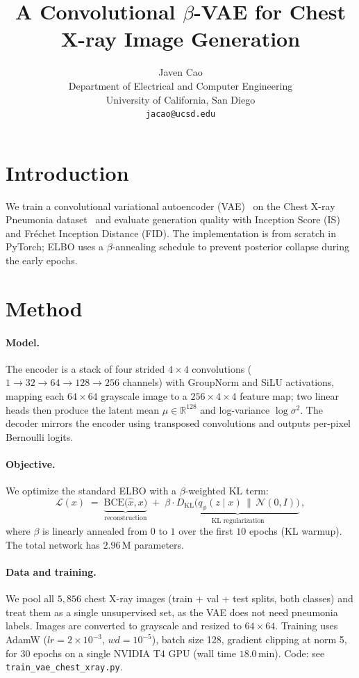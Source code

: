 \documentclass{article}
\title{A Convolutional $\beta$-VAE for Chest X-ray Image Generation}
\author{%
  Javen Cao \\
  Department of Electrical and Computer Engineering \\
  University of California, San Diego \\
  \texttt{jacao@ucsd.edu}
}
\begin{document}
\maketitle

\vspace{-1.0em}

\section{Introduction}
We train a convolutional variational autoencoder (VAE)~\cite{kingma2014} on the Chest X-ray
Pneumonia dataset~\cite{kermany2018} and evaluate generation quality with Inception
Score (IS) and Fr\'echet Inception Distance (FID). The implementation is from
scratch in PyTorch; ELBO uses a $\beta$-annealing schedule to prevent posterior collapse
during the early epochs.

\section{Method}

\paragraph{Model.} The encoder is a stack of four strided $4{\times}4$ convolutions
($1{\to}32{\to}64{\to}128{\to}256$ channels) with GroupNorm and SiLU activations, mapping
each $64{\times}64$ grayscale image to a $256{\times}4{\times}4$ feature map; two
linear heads then produce the latent mean $\mu \in \mathbb{R}^{128}$ and log-variance
$\log\sigma^2$. The decoder mirrors the encoder using transposed convolutions and outputs
per-pixel Bernoulli logits.

\paragraph{Objective.} We optimize the standard ELBO with a $\beta$-weighted KL term:
\begin{equation}
  \mathcal{L}(x) \;=\; \underbrace{\mathrm{BCE}\bigl(\hat{x}, x\bigr)}_{\text{reconstruction}}
  \;+\; \beta \cdot \underbrace{D_{\mathrm{KL}}\!\bigl(q_\phi(z\!\mid\!x)\,\|\,\mathcal{N}(0,I)\bigr)}_{\text{KL regularization}}\,,
\end{equation}
where $\beta$ is linearly annealed from $0$ to $1$ over the first $10$ epochs (KL warmup).
The total network has $2.96$\,M parameters.

\paragraph{Data and training.} We pool all $5{,}856$ chest X-ray images
(train + val + test splits, both classes) and treat them as a single unsupervised set, as
the VAE does not need pneumonia labels. Images are converted to grayscale and resized to
$64{\times}64$. Training uses AdamW ($lr=2{\times}10^{-3}$, $wd=10^{-5}$), batch size 128,
gradient clipping at norm 5, for $30$ epochs on a single NVIDIA T4 GPU
(wall time $18.0$\,min). Code: see \texttt{train\_vae\_chest\_xray.py}.
\end{document}
